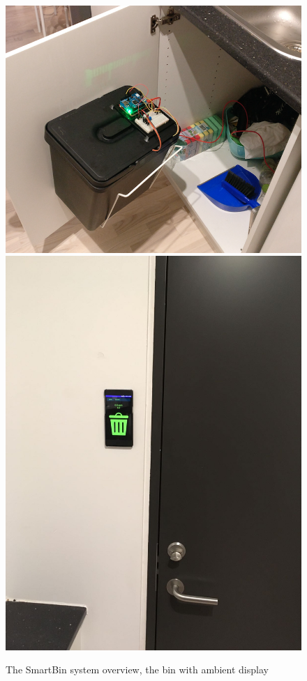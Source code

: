 \begin{figure}
\centering
\includegraphics[scale=.2]{img/smartbin}
\includegraphics[scale=.075]{img/IMG-20161130-WA0000}
\caption{The SmartBin system overview, the bin with ambient display}
\label{fig:smartbin}
\end{figure}